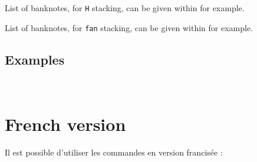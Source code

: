 \documentclass[11pt,a4paper]{ltxdoc}
\begin{document}
List of banknotes, for \texttt{H} stacking, can be given within  for example.

List of banknotes, for \texttt{fan} stacking, can be given within  for example.

\subsection{Examples}

\begin{DemoCode}{}
\\
\end{DemoCode}

\begin{DemoCode}{}
\end{DemoCode}

\begin{DemoCode}{}
\end{DemoCode}

\begin{DemoCode}{}
\end{DemoCode}

\begin{DemoCode}{}
\end{DemoCode}

\begin{DemoCode}{}
\end{DemoCode}

\pagebreak

\section{French version}

Il est possible d'utiliser les commandes en version francisée :
\end{document}
